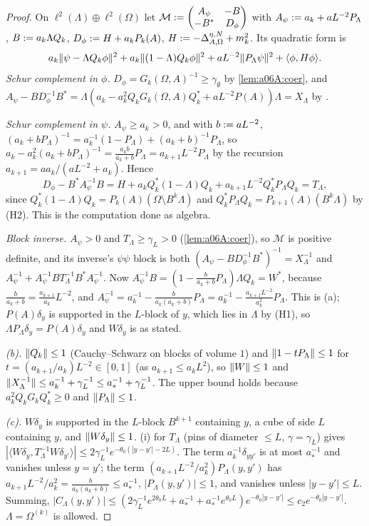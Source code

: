 \begin{proof}
On $\ell^2(\Lambda)\oplus\ell^2(\Omega)$ let $\mathcal M:=\begin{pmatrix}A_\psi&-B\\-B^*&D_\phi\end{pmatrix}$ with $A_\psi:= a_k+aL^{-2}P_\Lambda$, $B:= a_k\Lambda Q_k$, $D_\phi:= H+a_kP_k(A)$, $H:=-\Delta^{\eta,N}_{A,\Omega}+m_k^2$. Its quadratic form is
\[
a_k\lVert \psi-\Lambda Q_k\phi\rVert^2+a_k\lVert (1-\Lambda)Q_k\phi\rVert^2+aL^{-2}\lVert P_\Lambda\psi\rVert^2+\langle\phi,H\phi\rangle .
\]
\emph{Schur complement in $\phi$.} $D_\phi=G_k(\Omega,A)^{-1}\ge\gamma_\emptyset$ by \cref{lem:a06A:coer}, and $A_\psi-BD_\phi^{-1}B^*=\Lambda(a_k-a_k^2Q_kG_k(\Omega,A)Q_k^*+aL^{-2}P(A))\Lambda=X_\Lambda$ by \cite[(1.14)]{Ba4}.

\emph{Schur complement in $\psi$.} $A_\psi\ge a_k>0$, and with $b:= aL^{-2}$, $(a_k+bP_\Lambda)^{-1}=a_k^{-1}(1-P_\Lambda)+(a_k+b)^{-1}P_\Lambda$, so $a_k-a_k^2(a_k+bP_\Lambda)^{-1}=\frac{a_kb}{a_k+b}P_\Lambda=a_{k+1}L^{-2}P_\Lambda$ by the recursion $a_{k+1}=aa_k/(aL^{-2}+a_k)$. Hence
\[
D_\phi-B^*A_\psi^{-1}B=H+a_kQ_k^*(1-\Lambda)Q_k+a_{k+1}L^{-2}Q_k^*P_\Lambda Q_k=T_\Lambda,
\]
since $Q_k^*(1-\Lambda)Q_k=P_k(A)(\Omega\setminus B^k\Lambda)$ and $Q_k^*P_\Lambda Q_k=P_{k+1}(A)(B^k\Lambda)$ by (H2). This is the computation \cite[(3.4)--(3.5)]{Ba4} done as algebra.

\emph{Block inverse.} $A_\psi>0$ and $T_\Lambda\ge\gamma_L>0$ (\cref{lem:a06A:coer}), so $\mathcal M$ is positive definite, and its inverse's $\psi\psi$ block is both $(A_\psi-BD_\phi^{-1}B^*)^{-1}=X_\Lambda^{-1}$ and $A_\psi^{-1}+A_\psi^{-1}BT_\Lambda^{-1}B^*A_\psi^{-1}$. Now $A_\psi^{-1}B=(1-\frac{b}{a_k+b}P_\Lambda)\Lambda Q_k=W^*$, because $\frac{b}{a_k+b}=\frac{a_{k+1}}{a_k}L^{-2}$, and $A_\psi^{-1}=a_k^{-1}-\frac{b}{a_k(a_k+b)}P_\Lambda=a_k^{-1}-\frac{a_{k+1}L^{-2}}{a_k^2}P_\Lambda$. This is (a); $P(A)\delta_y$ is supported in the $L$-block of $y$, which lies in $\Lambda$ by (H1), so $\Lambda P_\Lambda\delta_y=P(A)\delta_y$ and $W\delta_y$ is as stated.

\emph{(b).} $\lVert Q_k\rVert\le1$ (Cauchy--Schwarz on blocks of volume $1$) and $\lVert 1-tP_\Lambda\rVert\le1$ for $t=(a_{k+1}/a_k)L^{-2}\in[0,1]$ (as $a_{k+1}\le a_kL^2$), so $\lVert W\rVert\le1$ and $\lVert X_\Lambda^{-1}\rVert\le a_k^{-1}+\gamma_L^{-1}\le a_*^{-1}+\gamma_L^{-1}$. The upper bound holds because $a_k^2Q_kG_kQ_k^*\ge0$ and $\lVert P_\Lambda\rVert\le1$.

\emph{(c).} $W\delta_y$ is supported in the $L$-block $B^{k+1}$ containing $y$, a cube of side $L$ containing $y$, and $\lVert W\delta_y\rVert\le1$. (i) for $T_\Lambda$ (pins of diameter $\le L$, $\gamma=\gamma_L$) gives $|\langle W\delta_y,T_\Lambda^{-1}W\delta_{y'}\rangle|\le2\gamma_L^{-1}e^{-\theta_0(|y-y'|-2L)}$. The term $a_k^{-1}\delta_{yy'}$ is at most $a_*^{-1}$ and vanishes unless $y=y'$; the term $(a_{k+1}L^{-2}/a_k^2)P_\Lambda(y,y')$ has $a_{k+1}L^{-2}/a_k^2=\frac{b}{a_k(a_k+b)}\le a_*^{-1}$, $|P_\Lambda(y,y')|\le1$, and vanishes unless $|y-y'|\le L$. Summing, $|C_\Lambda(y,y')|\le(2\gamma_L^{-1}e^{2\theta_0L}+a_*^{-1}+a_*^{-1}e^{\theta_0L})e^{-\theta_0|y-y'|}\le c_2e^{-\theta_0|y-y'|}$. $\Lambda=\Omega^{(k)}$ is allowed.
\end{proof}
